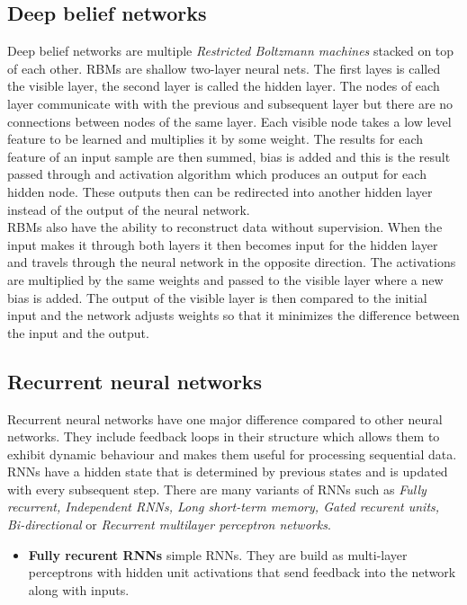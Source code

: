 \subsection{Deep belief networks}
Deep belief networks are multiple \textit{Restricted Boltzmann machines} stacked on top of each other. RBMs are shallow two-layer neural nets. The first layes is called the visible layer, the second layer is called the hidden layer. The nodes of each layer communicate with with the previous and subsequent layer but there are no connections between nodes of the same layer. Each visible node takes a low level feature to be learned and multiplies it by some weight. The results for each feature of an input sample are then summed, bias is added and this is the result passed through and activation algorithm which produces an output for each hidden node. These outputs then can be redirected into another hidden layer instead of the output of the neural network. \\
RBMs also have the ability to reconstruct data without supervision. When the input makes it through both layers it then becomes input for the hidden layer and travels through the neural network in the opposite direction. The activations are multiplied by the same weights and passed to the visible layer where a new bias is added. The output of the visible layer is then compared to the initial input and the network adjusts weights so that it minimizes the difference between the input and the output.

\subsection{Recurrent neural networks}
Recurrent neural networks have one major difference compared to other neural networks. They include feedback loops in their structure which allows them to exhibit dynamic behaviour and makes them useful for processing sequential data. RNNs have a hidden state that is determined by previous states and is updated with every subsequent step. There are many variants of RNNs such as \textit{Fully recurrent, Independent RNNs, Long short-term memory, Gated recurent units, Bi-directional} or \textit{Recurrent multilayer perceptron networks}. 

\begin{itemize}
    \item \textbf{Fully recurent RNNs} simple RNNs. They are build as multi-layer perceptrons with hidden unit activations that send feedback into the network along with inputs.
\end{itemize}

